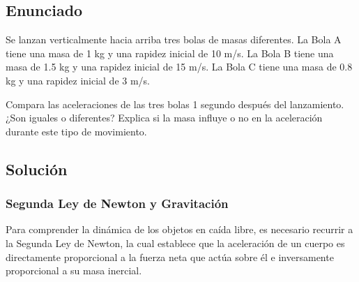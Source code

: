 \documentclass[12pt, a4paper]{article}
\begin{document}
\subsection*{Enunciado}

Se lanzan verticalmente hacia arriba tres bolas de masas diferentes. La Bola A tiene una masa de 1 kg y una rapidez inicial de 10 m/s. La Bola B tiene una masa de 1.5 kg y una rapidez inicial de 15 m/s. La Bola C tiene una masa de 0.8 kg y una rapidez inicial de 3 m/s. 

Compara las aceleraciones de las tres bolas 1 segundo después del lanzamiento. ¿Son iguales o diferentes? Explica si la masa influye o no en la aceleración durante este tipo de movimiento.

\vspace{0.5cm}

\begin{center}
\end{center}

\subsection*{Solución}

\subsubsection*{Segunda Ley de Newton y Gravitación}

Para comprender la dinámica de los objetos en caída libre, es necesario recurrir a la Segunda Ley de Newton, la cual establece que la aceleración de un cuerpo es directamente proporcional a la fuerza neta que actúa sobre él e inversamente proporcional a su masa inercial.
\end{document}
